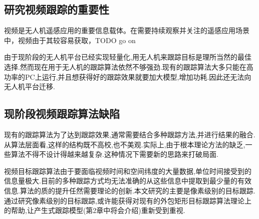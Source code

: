 \subsection{研究视频跟踪的重要性}
视频是无人机遥感应用的重要信息载体。在需要持续观察并关注的遥感应用场景中，视频由于其较容易获取，TODO go on
\par
由于现阶段的无人机平台已经实现轻量化,用无人机来跟踪目标是理所当然的最佳选择.然而现在用于无人机的跟踪算法依然不够强劲.现有的跟踪算法大多只能在高功率的PC上运行,并且想获得好的跟踪效果就要加大模型,增加功耗.因此还无法向无人机平台迁移.
\par
\subsection{现阶段视频跟踪算法缺陷}
现有的跟踪算法为了达到跟踪效果,通常需要结合多种跟踪方法,并进行结果的融合.从算法层面看,这样的结构既不高校,也不美观.实际上,由于根本理论方法的缺乏,一些算法不得不设计得越来越复杂.这种情况下需要新的思路来打破局面.
\par
视频目标跟踪算法由于要面临视频时间和空间纬度的大量数据,单位时间接受到的信息量极大.目前的多种跟踪方式均无法准确的从这些信息中提取到最少量的有效信息.算法的质的提升任然需要理论的创新.本文研究的主要是像素级别的目标跟踪.通过研究像素级别的目标跟踪,或许能获得对现有的外包矩形目标跟踪算法理论上的帮助,让产生式跟踪模型(第2章中将会介绍)重新受到重视.

